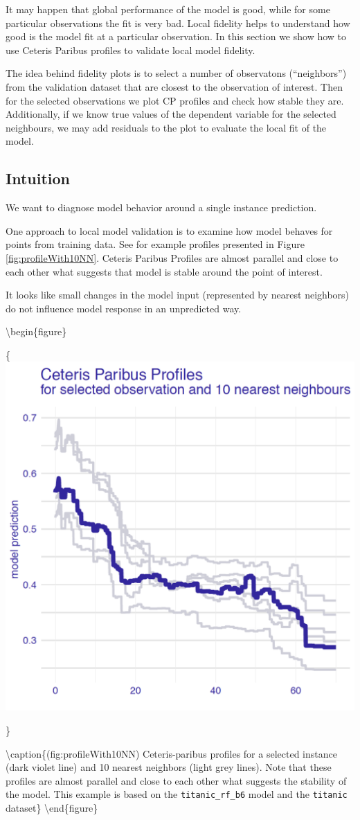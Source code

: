 \documentclass[12pt,]{krantz}
\theoremstyle{definition}
\theoremstyle{definition}
\theoremstyle{definition}
\theoremstyle{remark}
\begin{document}
It may happen that global performance of the model is good, while for
some particular observations the fit is very bad. Local fidelity helps
to understand how good is the model fit at a particular observation. In
this section we show how to use Ceteris Paribus profiles to validate
local model fidelity.

The idea behind fidelity plots is to select a number of observatons
(``neighbors'') from the validation dataset that are closest to the
observation of interest. Then for the selected observations we plot CP
profiles and check how stable they are. Additionally, if we know true
values of the dependent variable for the selected neighbours, we may add
residuals to the plot to evaluate the local fit of the model.

\hypertarget{intuition-3}{%
\subsection{Intuition}\label{intuition-3}}

We want to diagnose model behavior around a single instance prediction.

One approach to local model validation is to examine how model behaves
for points from training data. See for example profiles presented in
Figure \ref{fig:profileWith10NN}. Ceteris Paribus Profiles are almost
parallel and close to each other what suggests that model is stable
around the point of interest.

It looks like small changes in the model input (represented by nearest
neighbors) do not influence model response in an unpredicted way.

\textbackslash{}begin\{figure\}

\{\centering \includegraphics[width=0.5\linewidth]{figure/example_cp}

\}

\textbackslash{}caption\{(fig:profileWith10NN) Ceteris-paribus profiles
for a selected instance (dark violet line) and 10 nearest neighbors
(light grey lines). Note that these profiles are almost parallel and
close to each other what suggests the stability of the model. This
example is based on the \texttt{titanic\_rf\_b6} model and the
\texttt{titanic} dataset\}\label{fig:profileWith10NN}
\textbackslash{}end\{figure\}
\end{document}
